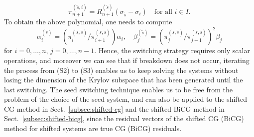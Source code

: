 \[\pi_{n+1}^{(\widetilde s,i)}=R_{n+1}^{(\widetilde s)}(\sigma_{\widetilde s}-\sigma_i)\quad\text{for all }i\in I.\]
{To obtain the above polynomial, one needs to compute}
\[\alpha_i^{(\widetilde s)}=\left(\pi_i^{(s,\widetilde s)}/\pi_{i+1}^{(s,\widetilde s)}\right)\alpha_i,\quad\beta_j^{(\widetilde s)}=\left(\pi_j^{(s,\widetilde s)}/\pi_{j+1}^{(s,\widetilde s)}\right)^2\beta_j\]
{for $i=0,\ldots,n$, $j=0,\ldots,n-1$. Hence, the switching strategy requires only scalar operations, and moreover we can see that if breakdown does not occur, iterating the process from (S2) to (S3) enables us to keep solving the systems without losing the dimension of the Krylov subspace that has been generated until the last switching. The seed switching technique enables us to be free from the problem of the choice of the seed system, and can also be applied to the shifted CG method in Sect.\ \ref{subsec:shifted-cg} and the shifted BiCG method in Sect.\ \ref{subsec:shifted-bicg}, since the residual vectors of the shifted CG (BiCG) method for shifted systems are true CG (BiCG) residuals.}
